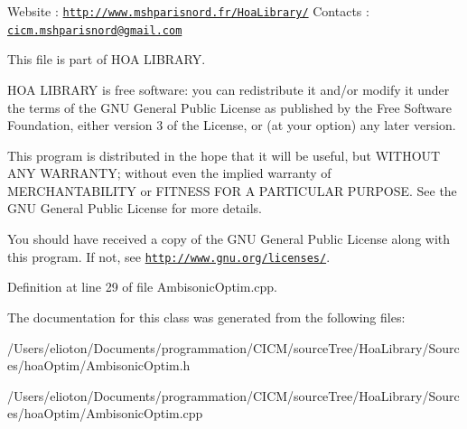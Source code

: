 Website \-: \href{http://www.mshparisnord.fr/HoaLibrary/}{\tt http\-://www.\-mshparisnord.\-fr/\-Hoa\-Library/} Contacts \-: \href{mailto:cicm.mshparisnord@gmail.com}{\tt cicm.\-mshparisnord@gmail.\-com}

This file is part of H\-O\-A L\-I\-B\-R\-A\-R\-Y.

H\-O\-A L\-I\-B\-R\-A\-R\-Y is free software\-: you can redistribute it and/or modify it under the terms of the G\-N\-U General Public License as published by the Free Software Foundation, either version 3 of the License, or (at your option) any later version.

This program is distributed in the hope that it will be useful, but W\-I\-T\-H\-O\-U\-T A\-N\-Y W\-A\-R\-R\-A\-N\-T\-Y; without even the implied warranty of M\-E\-R\-C\-H\-A\-N\-T\-A\-B\-I\-L\-I\-T\-Y or F\-I\-T\-N\-E\-S\-S F\-O\-R A P\-A\-R\-T\-I\-C\-U\-L\-A\-R P\-U\-R\-P\-O\-S\-E. See the G\-N\-U General Public License for more details.

You should have received a copy of the G\-N\-U General Public License along with this program. If not, see \href{http://www.gnu.org/licenses/}{\tt http\-://www.\-gnu.\-org/licenses/}. 

Definition at line 29 of file Ambisonic\-Optim.\-cpp.



The documentation for this class was generated from the following files\-:\begin{DoxyCompactItemize}
\item 
/\-Users/elioton/\-Documents/programmation/\-C\-I\-C\-M/source\-Tree/\-Hoa\-Library/\-Sources/hoa\-Optim/Ambisonic\-Optim.\-h\item 
/\-Users/elioton/\-Documents/programmation/\-C\-I\-C\-M/source\-Tree/\-Hoa\-Library/\-Sources/hoa\-Optim/Ambisonic\-Optim.\-cpp\end{DoxyCompactItemize}
